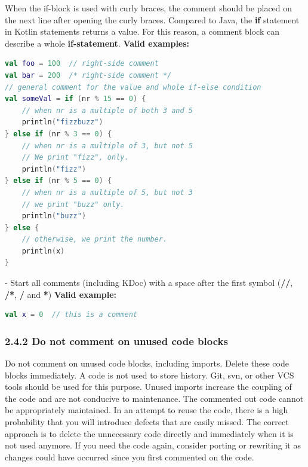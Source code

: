 When the if-block is used with curly braces, the comment should be placed on the next line after opening the curly braces.
Compared to Java, the \textbf{if} statement in Kotlin statements returns a value. For this reason, a comment block can describe a whole \textbf{if-statement}.
\textbf{Valid examples:}
\begin{lstlisting}[language=Kotlin]
val foo = 100  // right-side comment
val bar = 200  /* right-side comment */
// general comment for the value and whole if-else condition
val someVal = if (nr % 15 == 0) {
    // when nr is a multiple of both 3 and 5
    println("fizzbuzz")
} else if (nr % 3 == 0) {
    // when nr is a multiple of 3, but not 5
    // We print "fizz", only.
    println("fizz")
} else if (nr % 5 == 0) {
    // when nr is a multiple of 5, but not 3
    // we print "buzz" only.
    println("buzz")
} else {
    // otherwise, we print the number.
    println(x)
}
\end{lstlisting}
- Start all comments (including KDoc) with a space after the first symbol (\textbf{//}, \textbf{/*}, \textbf{/} and \textbf{*})
\textbf{Valid example:}
\begin{lstlisting}[language=Kotlin]
val x = 0  // this is a comment
\end{lstlisting}
\subsubsection*{\textbf{2.4.2 Do not comment on unused code blocks}}
\leavevmode\newline
\label{sec:2.4.2}
Do not comment on unused code blocks, including imports. Delete these code blocks immediately.
A code is not used to store history. Git, svn, or other VCS tools should be used for this purpose.
Unused imports increase the coupling of the code and are not conducive to maintenance. The commented out code cannot be appropriately maintained.
In an attempt to reuse the code, there is a high probability that you will introduce defects that are easily missed.
The correct approach is to delete the unnecessary code directly and immediately when it is not used anymore.
If you need the code again, consider porting or rewriting it as changes could have occurred since you first commented on the code.
